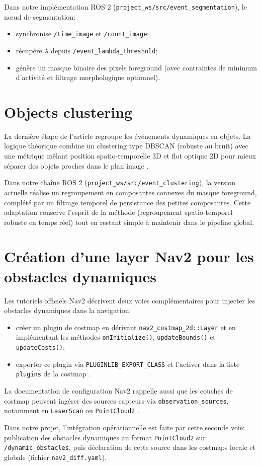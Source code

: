 Dans notre implémentation ROS 2 (\texttt{project\_ws/src/event\_segmentation}),
le nœud de segmentation:
\begin{itemize}
\item synchronise \texttt{/time\_image} et \texttt{/count\_image};
\item récupère $\lambda$ depuis \texttt{/event\_lambda\_threshold};
\item génère un masque binaire des pixels foreground (avec contraintes de
minimum d'activité et filtrage morphologique optionnel).
\end{itemize}

\section{Objects clustering}
La dernière étape de l'article regroupe les événements dynamiques en objets.
La logique théorique combine un clustering type DBSCAN (robuste au bruit) avec
une métrique mêlant position spatio-temporelle 3D et flot optique 2D pour
mieux séparer des objets proches dans le plan image \cite{zhao2023imo}.

Dans notre chaîne ROS 2 (\texttt{project\_ws/src/event\_clustering}), la
version actuelle réalise un regroupement en composantes connexes du masque
foreground, complété par un filtrage temporel de persistance des petites
composantes. Cette adaptation conserve l'esprit de la méthode (regroupement
spatio-temporel robuste en temps réel) tout en restant simple à maintenir dans
le pipeline global.

\section{Création d'une layer Nav2 pour les obstacles dynamiques}
Les tutoriels officiels Nav2 décrivent deux voies complémentaires pour injecter
les obstacles dynamiques dans la navigation:
\begin{itemize}
\item créer un plugin de costmap en dérivant \texttt{nav2\_costmap\_2d::Layer}
et en implémentant les méthodes \texttt{onInitialize()},
\texttt{updateBounds()} et \texttt{updateCosts()};
\item exporter ce plugin via \texttt{PLUGINLIB\_EXPORT\_CLASS} et l'activer
dans la liste \texttt{plugins} de la costmap \cite{nav2_plugin_tutorial}.
\end{itemize}

La documentation de configuration Nav2 rappelle aussi que les couches de
costmap peuvent ingérer des sources capteurs via
\texttt{observation\_sources}, notamment en \texttt{LaserScan} ou
\texttt{PointCloud2} \cite{nav2_costmap_config}.

Dans notre projet, l'intégration opérationnelle est faite par cette seconde
voie: publication des obstacles dynamiques au format \texttt{PointCloud2} sur
\texttt{/dynamic\_obstacles}, puis déclaration de cette source dans les
costmaps locale et globale (fichier \texttt{nav2\_diff.yaml}).
